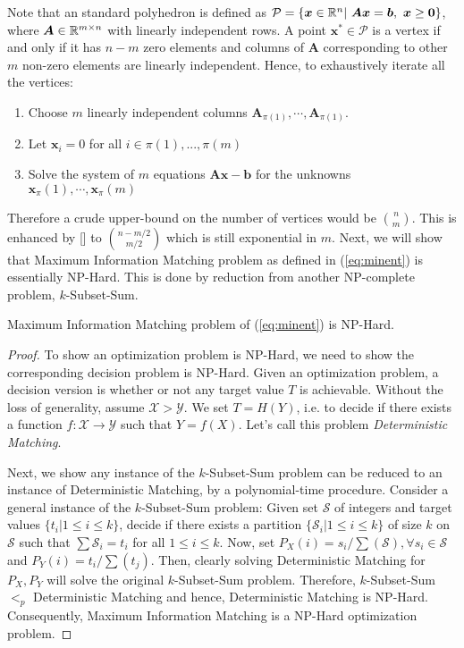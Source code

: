 Note that an standard polyhedron is defined as $\mathcal{P}=\{\bm{x} \in \mathbb{R}^n | \ \bm{A}\bm{x} = \bm{b}, \ \bm{x} \geq \bm{0}\}$, where $\bm{A} \in \mathbb{R} ^{m \times n}$ with linearly independent rows. A point $\bm{x}^* \in \mathcal{P}$ is a vertex if and only if it has $n-m$ zero elements and columns of $\bm{A}$ corresponding to other $m$ non-zero elements are linearly independent. Hence, to exhaustively iterate all the vertices:
\begin{enumerate}
    \item Choose $m$ linearly independent columns $\bm{A}_{\pi(1)}, \cdots, \bm{A}_{\pi(1)}$.
    \item Let $\bm{x}_i= 0$ for all  $i \in \pi(1),..., \pi(m)$
    \item Solve the system of $m$ equations $\bm{A}\bm{x} - \bm{b}$ for the unknowns $\bm{x}_\pi(1), \cdots, \bm{x}_\pi(m)$
\end{enumerate}

Therefore a crude upper-bound on the number of vertices would be ${n \choose m}$. This is enhanced by [] to ${n-m/2 \choose m/2}$ which is still exponential in $m$. 
Next, we will show that Maximum Information Matching problem as defined in (\ref{eq:minent}) is essentially NP-Hard. This is done by reduction from another NP-complete problem, $k$-Subset-Sum.

\begin{remark} Maximum Information Matching problem of (\ref{eq:minent}) is NP-Hard.
\end{remark}
\begin{proof}
To show an optimization problem is NP-Hard, we need to show the corresponding decision problem is NP-Hard.  Given an optimization problem, a decision version is whether or not any target value $T$ is achievable. Without the loss of generality, assume $\mathcal{X} > \mathcal{Y}$. We set $T=H(Y)$, i.e. to decide if there exists a function $f: \mathcal{X}\to\mathcal{Y}$ such that $Y=f(X)$. Let's call this problem \textit{Deterministic Matching}.

Next, we show any instance of the $k$-Subset-Sum problem can be reduced to an instance of Deterministic Matching, by a polynomial-time procedure. Consider a general instance of the $k$-Subset-Sum problem: Given set $\mathcal{S}$ of integers and target values $\{t_i|1\leq i\leq k\}$, decide if there exists a partition $\{\mathcal{S}_i|1\leq i\leq k \}$ of size $k$ on $\mathcal{S}$ such that $\sum \mathcal{S}_i = t_i$ for all $1\leq i\leq k$. 
Now, set $P_X(i)=s_i/\sum(\mathcal{S}), \forall s_i \in \mathcal{S}$ and $P_Y(i)=t_i / \sum(t_j)$. Then, clearly solving Deterministic Matching for $P_X, P_Y$ will solve the original $k$-Subset-Sum problem. Therefore, $k$-Subset-Sum  $<_p$ Deterministic Matching and hence, Deterministic Matching is NP-Hard. Consequently, Maximum Information Matching is a NP-Hard optimization problem.
\end{proof}

